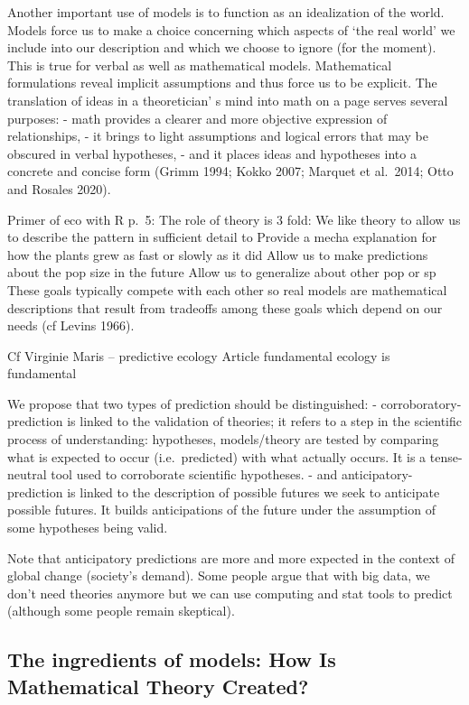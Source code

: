 \documentclass[
]{book}
\theoremstyle{definition}
\theoremstyle{definition}
\theoremstyle{definition}
\theoremstyle{definition}
\theoremstyle{remark}
\begin{document}
Another important use of models is to function as an idealization of the world. Models
force us to make a choice concerning which aspects of `the real world' we include into
our description and which we choose to ignore (for the moment). This is true for verbal
as well as mathematical models. Mathematical formulations reveal implicit
assumptions and thus force us to be explicit. The translation of ideas in a theoretician' s mind into math on a page serves several purposes:
- math provides a clearer and more objective expression of relationships,
- it brings to light assumptions and logical errors that may be obscured in verbal hypotheses,
- and it places ideas and hypotheses into a concrete and concise form (Grimm 1994; Kokko 2007; Marquet et al.~2014; Otto and Rosales 2020).

Primer of eco with R p.~5:
The role of theory is 3 fold:
We like theory to allow us to describe the pattern in sufficient detail to
Provide a mecha explanation for how the plants grew as fast or slowly as it did
Allow us to make predictions about the pop size in the future
Allow us to generalize about other pop or sp
These goals typically compete with each other so real models are mathematical descriptions that result from tradeoffs among these goals which depend on our needs (cf Levins 1966).

Cf Virginie Maris -- predictive ecology
Article fundamental ecology is fundamental

We propose that two types of prediction should be distinguished:
- corroboratory-prediction is linked to the validation of theories; it refers to a step in the scientific process of understanding: hypotheses, models/theory are tested by comparing what is expected to occur (i.e.~predicted) with what actually occurs. It is a tense-neutral tool used to corroborate scientific hypotheses.
- and anticipatory-prediction is linked to the description of possible futures we seek to anticipate possible futures. It builds anticipations of the future under the assumption of some hypotheses being valid.

Note that anticipatory predictions are more and more expected in the context of global change (society's demand). Some people argue that with big data, we don't need theories anymore but we can use computing and stat tools to predict (although some people remain skeptical).

\subsection{The ingredients of models: How Is Mathematical Theory Created?}\label{the-ingredients-of-models-how-is-mathematical-theory-created}
\end{document}
